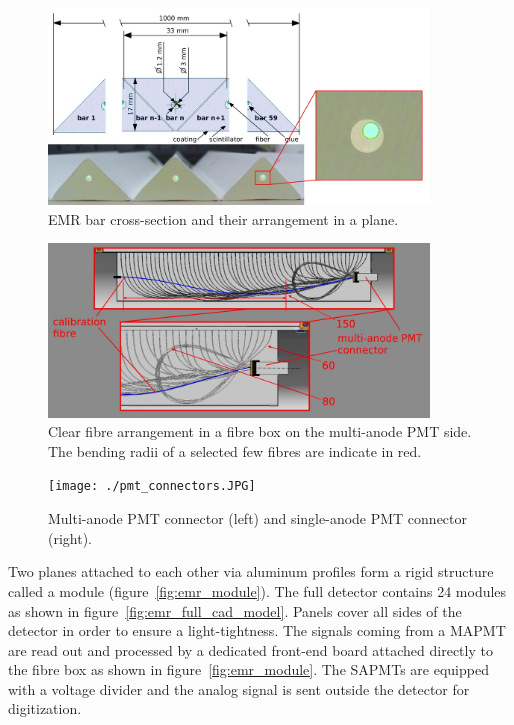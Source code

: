 \documentclass[a4paper,11pt]{article}
\begin{document}
\begin{figure}
 \centering
 \includegraphics[width=0.9\textwidth]{./bar_arrangement_in_a_plane}
 \caption[EMR bar cross-section and plane arrangement]{EMR bar cross-section and their arrangement in a plane.}
 \label{fig:bar_arrangement_in_a_plane}
\end{figure}

\begin{figure}
 \centering
 \includegraphics[width=0.9\textwidth]{./clear_fiber_package}
 \caption[A package of clear fibres in a fibre box]{Clear fibre arrangement in a fibre box on the  multi-anode PMT side. The bending radii of
 a selected few fibres are indicate in red.}
 \label{fig:clear_fibre_package}
\end{figure}

\begin{figure}[htp!]
 \centering
 \texttt{[image: ./pmt\_connectors.JPG]}
 \caption[PMT connectors]{Multi-anode PMT connector (left) and single-anode PMT connector (right).}
 \label{fig:pmt_connectors}
\end{figure}

Two planes attached to each other via aluminum profiles form a rigid structure called a module (figure~\ref{fig:emr_module}). The full detector
contains 24 modules as shown in figure~\ref{fig:emr_full_cad_model}. Panels cover all sides of the detector in order to ensure a light-tightness.
The signals coming from a MAPMT are read out and processed by a dedicated front-end board attached directly to the fibre box as shown in
figure~\ref{fig:emr_module}. The SAPMTs are equipped with a voltage divider and the analog signal is sent outside the detector for digitization.
\end{document}

